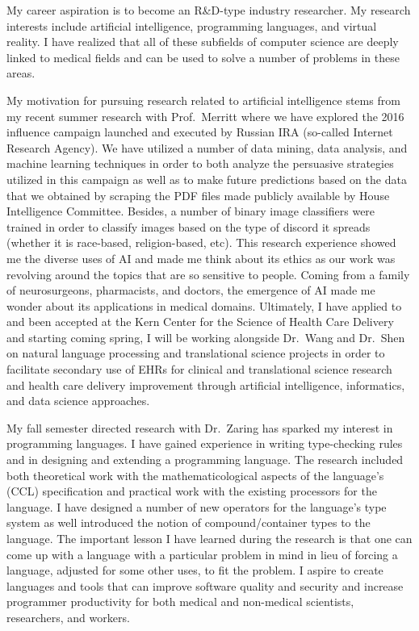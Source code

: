 \documentclass[a4paper,11pt,sans]{moderncv}
\date{January 11, 2020}
\begin{document}
\makelettertitle%

\justify%

My career aspiration is to become an R\&D-type industry researcher. My research
interests include artificial intelligence, programming languages, and virtual
reality. I have realized that all of these subfields of computer science are
deeply linked to medical fields and can be used to solve a number of problems
in these areas.

My motivation for pursuing research related to artificial intelligence stems
from my recent summer research with Prof.~Merritt where we have explored the
2016 influence campaign launched and executed by Russian IRA (so-called
Internet Research Agency). We have utilized a number of data mining, data
analysis, and machine learning techniques in order to both analyze the
persuasive strategies utilized in this campaign as well as to make future
predictions based on the data that we obtained by scraping the PDF files made
publicly available by House Intelligence Committee. Besides, a number of binary
image classifiers were trained in order to classify images based on the type of
discord it spreads (whether it is race-based, religion-based, etc).  This
research experience showed me the diverse uses of AI and made me think about
its ethics as our work was revolving around the topics that are so sensitive to
people. Coming from a family of neurosurgeons, pharmacists, and doctors, the
emergence of AI made me wonder about its applications in medical domains.
Ultimately, I have applied to and been accepted at the Kern Center for the
Science of Health Care Delivery and starting coming spring, I will be working
alongside Dr.~Wang and Dr.~Shen on natural language processing and
translational science projects in order to facilitate secondary use of EHRs for
clinical and translational science research and health care delivery
improvement through artificial intelligence, informatics, and data science
approaches.

My fall semester directed research with Dr.~Zaring has sparked my interest in
programming languages. I have gained experience in writing type-checking rules
and in designing and extending a programming language. The research included
both theoretical work with the mathematicological aspects of the language's
(CCL) specification and practical work with the existing processors for the
language. I have designed a number of new operators for the language's type
system as well introduced the notion of compound/container types to the
language. The important lesson I have learned during the research is that one
can come up with a language with a particular problem in mind in lieu of
forcing a language, adjusted for some other uses, to fit the problem. I aspire
to create languages and tools that can improve software quality and security
and increase programmer productivity for both medical and non-medical
scientists, researchers, and workers.
\end{document}
